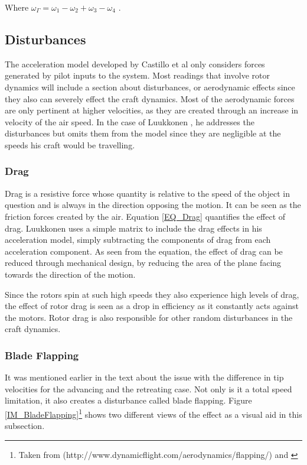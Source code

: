 		Where $\omega_\Gamma = \omega_1 - \omega_2 + \omega_3 - \omega_4$ \cite{Luukkonen}.
	
	\subsection{Disturbances}
	The acceleration model developed by Castillo et al \cite{MiniFlying} only considers forces generated by pilot inputs to the system. Most readings that involve rotor dynamics will include a section about disturbances, or aerodynamic effects \cite{Hoffmann, Pounds2006, Luukkonen, NearWall} since they also can severely effect the craft dynamics. Most of the aerodynamic forces are only pertinent at higher velocities, as they are created through an increase in velocity of the air speed. In the case of Luukkonen \cite{Luukkonen}, he addresses the disturbances but omits them from the model since they are negligible at the speeds his craft would be travelling.
	
		\subsubsection{Drag}
		Drag is a resistive force whose quantity is relative to the speed of the object in question and is always in the direction opposing the motion. It can be seen as the friction forces created by the air. Equation \ref{EQ_Drag} quantifies the effect of drag. Luukkonen \cite{Luukkonen} uses a simple matrix to include the drag effects in his acceleration model, simply subtracting the components of drag from each acceleration component. As seen from the equation, the effect of drag can be reduced through mechanical design, by reducing the area of the plane facing towards the direction of the motion. 
		
		Since the rotors spin at such high speeds they also experience high levels of drag, the effect of rotor drag is seen as a drop in efficiency as it constantly acts against the motors. Rotor drag is also responsible for other random disturbances in the craft dynamics.
		
		\subsubsection{Blade Flapping}
		It was mentioned earlier in the text about the issue with the difference in tip velocities for the advancing and the retreating case. Not only is it a total speed limitation, it also creates a disturbance called blade flapping. Figure \ref{IM_BladeFlapping}\footnote{Taken from (http://www.dynamicflight.com/aerodynamics/flapping/) and \cite{Hoffmann}} shows two different views of the effect as a visual aid in this subsection. 
		
